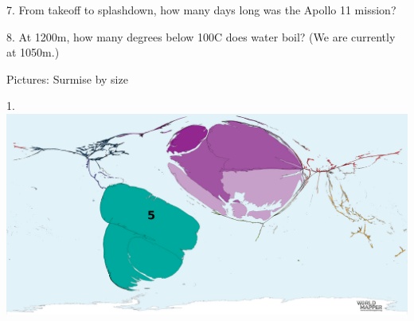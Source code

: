\begin{frame}
\begin{center}
\Large
7. From takeoff to splashdown, how many days long was the Apollo 11 mission?
\\
\end{center}
\end{frame}
\begin{frame}
\begin{center}
\Large
8. At 1200m, how many degrees below 100\textdegree C does water boil? (We are currently at 1050m.)
\\
\end{center}
\end{frame}
\begin{frame}
\begin{center}
\Huge
Pictures: Surmise by size
\end{center}
\end{frame}
\begin{frame}
\begin{center}
\Large
1. 
\\
\vspace{0.5em}\includegraphics[height=0.6\paperheight]{maps/picture_1.png}
\\
\end{center}
\end{frame}
